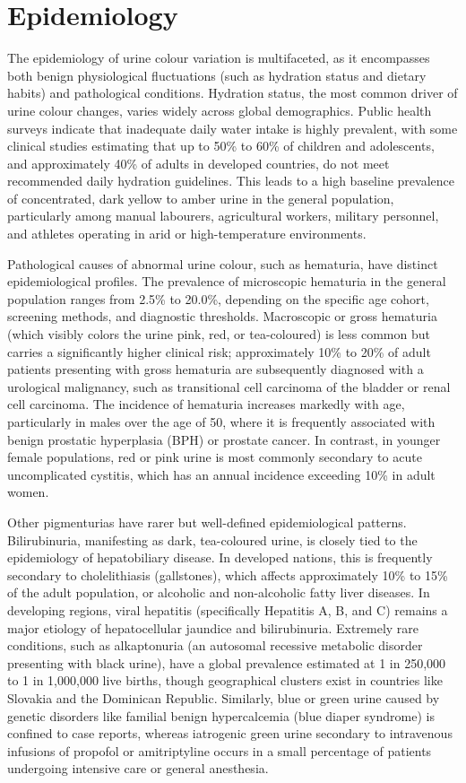 \section*{Epidemiology}
The epidemiology of urine colour variation is multifaceted, as it encompasses both benign physiological fluctuations (such as hydration status and dietary habits) and pathological conditions. Hydration status, the most common driver of urine colour changes, varies widely across global demographics. Public health surveys indicate that inadequate daily water intake is highly prevalent, with some clinical studies estimating that up to 50\% to 60\% of children and adolescents, and approximately 40\% of adults in developed countries, do not meet recommended daily hydration guidelines. This leads to a high baseline prevalence of concentrated, dark yellow to amber urine in the general population, particularly among manual labourers, agricultural workers, military personnel, and athletes operating in arid or high-temperature environments.

Pathological causes of abnormal urine colour, such as hematuria, have distinct epidemiological profiles. The prevalence of microscopic hematuria in the general population ranges from 2.5\% to 20.0\%, depending on the specific age cohort, screening methods, and diagnostic thresholds. Macroscopic or gross hematuria (which visibly colors the urine pink, red, or tea-coloured) is less common but carries a significantly higher clinical risk; approximately 10\% to 20\% of adult patients presenting with gross hematuria are subsequently diagnosed with a urological malignancy, such as transitional cell carcinoma of the bladder or renal cell carcinoma. The incidence of hematuria increases markedly with age, particularly in males over the age of 50, where it is frequently associated with benign prostatic hyperplasia (BPH) or prostate cancer. In contrast, in younger female populations, red or pink urine is most commonly secondary to acute uncomplicated cystitis, which has an annual incidence exceeding 10\% in adult women.

Other pigmenturias have rarer but well-defined epidemiological patterns. Bilirubinuria, manifesting as dark, tea-coloured urine, is closely tied to the epidemiology of hepatobiliary disease. In developed nations, this is frequently secondary to cholelithiasis (gallstones), which affects approximately 10\% to 15\% of the adult population, or alcoholic and non-alcoholic fatty liver diseases. In developing regions, viral hepatitis (specifically Hepatitis A, B, and C) remains a major etiology of hepatocellular jaundice and bilirubinuria. Extremely rare conditions, such as alkaptonuria (an autosomal recessive metabolic disorder presenting with black urine), have a global prevalence estimated at 1 in 250,000 to 1 in 1,000,000 live births, though geographical clusters exist in countries like Slovakia and the Dominican Republic. Similarly, blue or green urine caused by genetic disorders like familial benign hypercalcemia (blue diaper syndrome) is confined to case reports, whereas iatrogenic green urine secondary to intravenous infusions of propofol or amitriptyline occurs in a small percentage of patients undergoing intensive care or general anesthesia.

